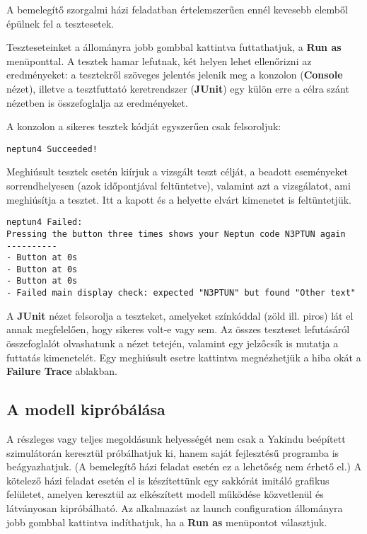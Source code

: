 A bemelegítő szorgalmi házi feladatban értelemszerűen ennél kevesebb elemből épülnek fel a tesztesetek.

Teszteseteinket a  állományra jobb gombbal kattintva futtathatjuk, a \textbf{Run as} menüponttal. A tesztek hamar lefutnak, két helyen lehet ellenőrizni az eredményeket: a tesztekről szöveges jelentés jelenik meg a konzolon (\textbf{Console} nézet), illetve a tesztfuttató keretrendszer (\textbf{JUnit}) egy külön erre a célra szánt nézetben is összefoglalja az eredményeket.

A konzolon a sikeres tesztek kódját egyszerűen csak felsoroljuk:

\begin{lstlisting}
neptun4 Succeeded!
\end{lstlisting}

Meghiúsult tesztek esetén kiírjuk a vizsgált teszt célját, a beadott eseményeket sorrendhelyesen (azok időpontjával feltüntetve), valamint azt a vizsgálatot, ami meghiúsítja a tesztet. Itt a kapott és a helyette elvárt kimenetet is feltüntetjük.

\begin{lstlisting}
neptun4 Failed:
Pressing the button three times shows your Neptun code N3PTUN again
----------
- Button at 0s
- Button at 0s
- Button at 0s
- Failed main display check: expected "N3PTUN" but found "Other text"
\end{lstlisting}

A \textbf{JUnit} nézet felsorolja a teszteket, amelyeket színkóddal (zöld ill. piros) lát el annak megfelelően, hogy sikeres volt-e vagy sem. Az összes teszteset lefutásáról összefoglalót olvashatunk a nézet tetején, valamint egy jelzőcsík is mutatja a futtatás kimenetelét. Egy meghiúsult esetre kattintva megnézhetjük a hiba okát a \textbf{Failure Trace} ablakban.

\subsection{A modell kipróbálása}

A részleges vagy teljes megoldásunk helyességét nem csak a Yakindu beépített szimulátorán keresztül próbálhatjuk ki, hanem saját fejlesztésű programba is beágyazhatjuk. (A bemelegítő házi feladat esetén ez a lehetőség nem érhető el.) A kötelező házi feladat esetén el is készítettünk egy sakkórát imitáló grafikus felületet, amelyen keresztül az elkészített modell működése közvetlenül és látványosan kipróbálható. Az alkalmazást az  launch configuration állományra jobb gombbal kattintva indíthatjuk, ha a \textbf{Run as} menüpontot választjuk.

